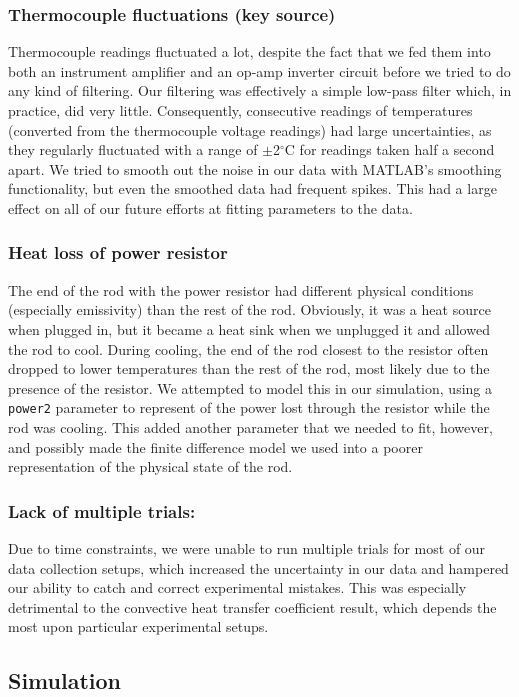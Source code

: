 \documentclass[letterpaper,titlepage,oneside]{report}
\begin{document}
\subsubsection*{Thermocouple fluctuations (key source)}
Thermocouple readings fluctuated a lot, despite the fact that
we fed them into both an instrument amplifier and an op-amp
inverter circuit before we tried to do any kind of filtering.
Our filtering was effectively a simple low-pass filter which,
in practice, did very little. Consequently, consecutive
readings of temperatures (converted from the thermocouple
voltage readings) had large uncertainties, as they regularly
fluctuated with a range of $\pm$2$^{\circ}$C for readings taken
half a second apart. We tried to smooth out the noise in our data
with MATLAB's smoothing functionality, but even the smoothed
data had frequent spikes. This had a large effect on all of
our future efforts at fitting parameters to the data.

\subsubsection* {Heat loss of power resistor}
The end of the rod with the power resistor had different
physical conditions (especially emissivity) than the rest of
the rod. Obviously, it was a heat source when plugged in,
but it became a heat sink when we unplugged it and allowed the rod
to cool. During cooling, the end of the rod closest to the
resistor often dropped to lower temperatures than the rest of
the rod, most likely due to the presence of the resistor.
We attempted to model this in our simulation, using
a \texttt{power2} parameter to represent of the power lost through
the resistor while the rod was cooling. This added another
parameter that we needed to fit, however, and possibly made the
finite difference model we used into a poorer representation of
the physical state of the rod.

\subsubsection* {Lack of multiple trials:}
Due to time constraints, we were unable to run multiple trials
for most of our data collection setups, which increased the
uncertainty in our data and hampered our ability to catch and
correct experimental mistakes. This was especially detrimental
to the convective heat transfer coefficient result,
which depends the most upon particular experimental setups. 

\subsection*{Simulation}
\end{document}
